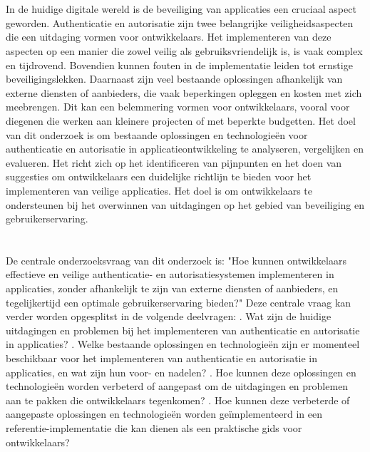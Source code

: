 \section{}%
\label{sec:probleemstelling}
In de huidige digitale wereld is de beveiliging van applicaties een cruciaal aspect geworden. Authenticatie en autorisatie zijn twee belangrijke veiligheidsaspecten die een uitdaging vormen voor ontwikkelaars. 
Het implementeren van deze aspecten op een manier die zowel veilig als gebruiksvriendelijk is, is vaak complex en tijdrovend. Bovendien kunnen fouten in de implementatie leiden tot ernstige beveiligingslekken. 
\newline
Daarnaast zijn veel bestaande oplossingen afhankelijk van externe diensten of aanbieders, die vaak beperkingen opleggen en kosten met zich meebrengen. Dit kan een belemmering vormen voor ontwikkelaars, 
vooral voor diegenen die werken aan kleinere projecten of met beperkte budgetten.
\newline
Het doel van dit onderzoek is om bestaande oplossingen en technologieën voor authenticatie en autorisatie in applicatieontwikkeling te analyseren, vergelijken en evalueren. 
Het richt zich op het identificeren van pijnpunten en het doen van suggesties om ontwikkelaars een duidelijke richtlijn te bieden voor het implementeren van veilige applicaties. 
Het doel is om ontwikkelaars te ondersteunen bij het overwinnen van uitdagingen op het gebied van beveiliging en gebruikerservaring.

\section{}%
\label{sec:onderzoeksvraag}

De centrale onderzoeksvraag van dit onderzoek is: "Hoe kunnen ontwikkelaars effectieve en veilige authenticatie- en autorisatiesystemen implementeren in applicaties, zonder afhankelijk te zijn van 
externe diensten of aanbieders, en tegelijkertijd een optimale gebruikerservaring bieden?"
\newline
\newline
Deze centrale vraag kan verder worden opgesplitst in de volgende deelvragen:
\newline
{}. Wat zijn de huidige uitdagingen en problemen bij het implementeren van authenticatie en autorisatie in applicaties?
. Welke bestaande oplossingen en technologieën zijn er momenteel beschikbaar voor het implementeren van authenticatie en autorisatie in applicaties, en wat zijn hun voor- en nadelen?
. Hoe kunnen deze oplossingen en technologieën worden verbeterd of aangepast om de uitdagingen en problemen aan te pakken die ontwikkelaars tegenkomen?
. Hoe kunnen deze verbeterde of aangepaste oplossingen en technologieën worden geïmplementeerd in een referentie-implementatie die kan dienen als een praktische gids voor ontwikkelaars?

